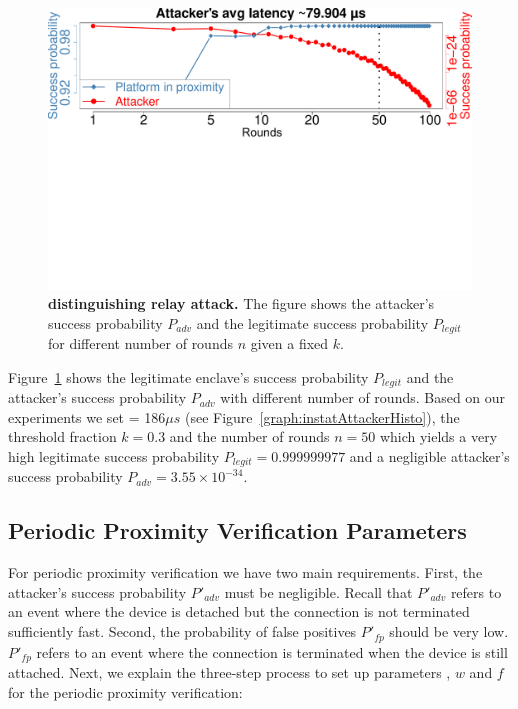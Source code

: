 \begin{figure}[h]
  \centering
    \includegraphics[trim={0 12.8cm 0 0}, clip, width=0.9\linewidth]{chapters/ProximiTEE/figures/InstantAttackerSuccess.pdf}
    \caption[\name distinguishing relay attack]{\textbf{\name distinguishing relay attack.} The figure shows the attacker's success probability $P_{adv}$ and the legitimate success probability $P_{legit}$ for different number of rounds $n$ given a fixed $k$.}

    \label{graph:instantAttackerSuccess}
\end{figure}


 Figure~\ref{graph:instantAttackerSuccess} shows the legitimate enclave's success probability $P_{legit}$ and the attacker's success probability $P_{adv}$ with different number of rounds. Based on our experiments we set \connect= 186$\mu s$ (see Figure~\ref{graph:instatAttackerHisto}), the threshold fraction $k=0.3$ and the number of rounds $n=50$ which yields a very high legitimate success probability $P_{legit}=0.999999977$ and a negligible attacker's success probability $P_{adv}=3.55\times 10^{-34}$.





\subsection{Periodic Proximity Verification Parameters}
\label{sec:evaluationL:continuousParameters}


For periodic proximity verification we have two main requirements. First, the attacker's success probability $P'_{adv}$ must be negligible. Recall that $P'_{adv}$ refers to an event where the device is detached but the connection is not terminated sufficiently fast. Second, the probability of false positives $P'_{fp}$ should be very low. $P'_{fp}$ refers to an event where the connection is terminated when the device is still attached. Next, we explain the three-step process to set up parameters \detach, $w$ and $f$ for the periodic proximity verification:

